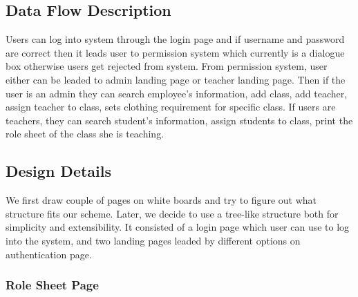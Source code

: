 \subsection{Data Flow Description}
Users can log into system through the login page and if username and password are correct then it leads user to permission system which currently is a dialogue box otherwise users get rejected from system. From permission system, user either can be leaded to admin landing page or teacher landing page. Then if the user is an admin they can search employee's information, add class, add teacher, assign teacher to class, sets clothing requirement for specific class. If users are teachers, they can search student's information, assign students to class, print the role sheet of the class she is teaching. 

\subsection{Design Details}
We first draw couple of pages on white boards and try to figure out what structure fits our scheme. Later, we decide to use a tree-like structure both for simplicity and extensibility. It consisted of a login page which user can use to log into the system, and two landing pages leaded by different options on authentication page. 

\subsubsection{Role Sheet Page}

